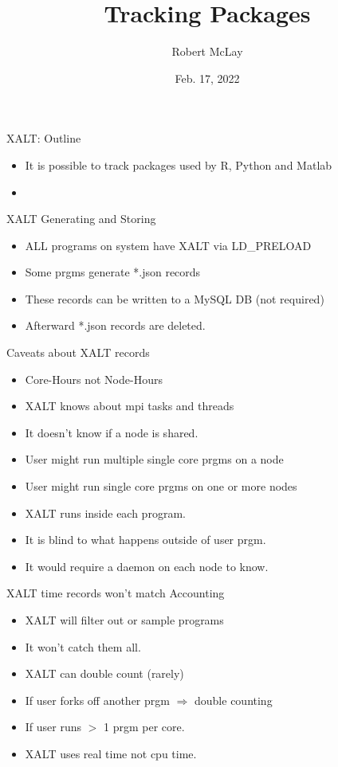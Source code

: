 \documentclass{beamer}
\begin{document}
\title[XALT]{Tracking Packages}
\author{Robert McLay} 
\date{Feb. 17, 2022} 

\frame{\titlepage} 

\begin{frame}{XALT: Outline}
  \begin{itemize}
    \item It is possible to track packages used by R, Python and
      Matlab
    \item 
  \end{itemize}
\end{frame}

\begin{frame}{XALT Generating and Storing}
  \begin{itemize}
    \item ALL programs on system have XALT via LD\_PRELOAD
    \item Some prgms generate \**.json records
    \item These records can be written to a MySQL DB (not required) 
    \item Afterward \**.json records are deleted.
  \end{itemize}
\end{frame}

\begin{frame}{Caveats about XALT records}
  \begin{itemize}
    \item Core-Hours not Node-Hours 
    \item XALT knows about mpi tasks and threads
    \item It doesn't know if a node is shared.
    \item User might run multiple single core prgms on a node
    \item User might run single core prgms on one or more nodes
    \item XALT runs inside each program.
    \item It is blind to what happens outside of user prgm.
    \item It would require a daemon on each node to know.
  \end{itemize}
\end{frame}

\begin{frame}{XALT time records won't match Accounting}
  \begin{itemize}
    \item XALT will filter out or sample programs
    \item It won't catch them all.
    \item XALT can double count (rarely)
    \item If user forks off another prgm $\Rightarrow$ double counting
    \item If user runs $>$ 1 prgm per core.
    \item XALT uses real time not cpu time.
  \end{itemize}
\end{frame}
\end{document}
